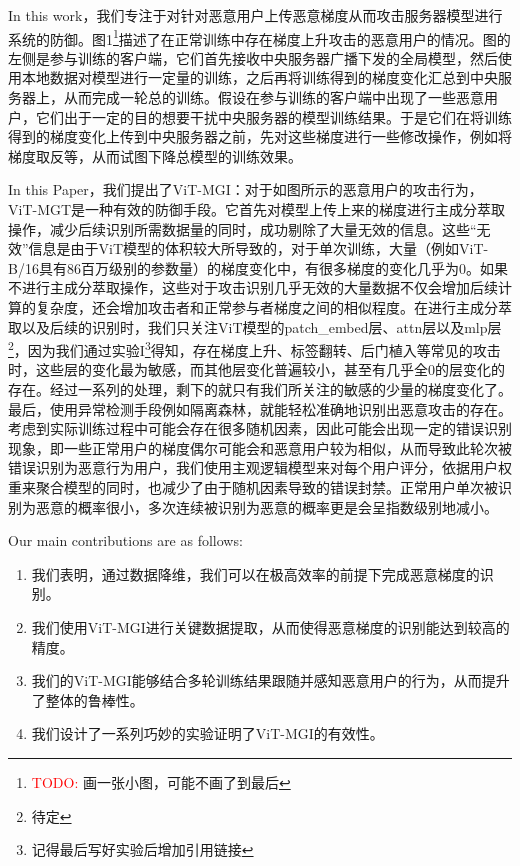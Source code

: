 \documentclass[conference]{IEEEtran}
\begin{document}
In this work，我们专注于对针对恶意用户上传恶意梯度从而攻击服务器模型进行系统的防御。图1\footnote{\textcolor{red}{TODO:} 画一张小图，可能不画了到最后}描述了在正常训练中存在梯度上升攻击的恶意用户的情况。图的左侧是参与训练的客户端，它们首先接收中央服务器广播下发的全局模型，然后使用本地数据对模型进行一定量的训练，之后再将训练得到的梯度变化汇总到中央服务器上，从而完成一轮总的训练。假设在参与训练的客户端中出现了一些恶意用户，它们出于一定的目的想要干扰中央服务器的模型训练结果。于是它们在将训练得到的梯度变化上传到中央服务器之前，先对这些梯度进行一些修改操作，例如将梯度取反等，从而试图下降总模型的训练效果。

In this Paper，我们提出了ViT-MGI：对于如图所示的恶意用户的攻击行为，ViT-MGT是一种有效的防御手段。它首先对模型上传上来的梯度进行主成分萃取操作，减少后续识别所需数据量的同时，成功剔除了大量无效的信息。这些“无效”信息是由于ViT模型的体积较大所导致的，对于单次训练，大量（例如ViT-B/16具有86百万级别的参数量）的梯度变化中，有很多梯度的变化几乎为0。如果不进行主成分萃取操作，这些对于攻击识别几乎无效的大量数据不仅会增加后续计算的复杂度，还会增加攻击者和正常参与者梯度之间的相似程度。在进行主成分萃取以及后续的识别时，我们只关注ViT模型的patch\_embed层、attn层以及mlp层\footnote{待定}，因为我们通过实验I\footnote{记得最后写好实验后增加引用链接}得知，存在梯度上升、标签翻转、后门植入等常见的攻击时，这些层的变化最为敏感，而其他层变化普遍较小，甚至有几乎全0的层变化的存在。经过一系列的处理，剩下的就只有我们所关注的敏感的少量的梯度变化了。最后，使用异常检测手段例如隔离森林，就能轻松准确地识别出恶意攻击的存在。考虑到实际训练过程中可能会存在很多随机因素，因此可能会出现一定的错误识别现象，即一些正常用户的梯度偶尔可能会和恶意用户较为相似，从而导致此轮次被错误识别为恶意行为用户，我们使用主观逻辑模型来对每个用户评分，依据用户权重来聚合模型的同时，也减少了由于随机因素导致的错误封禁。正常用户单次被识别为恶意的概率很小，多次连续被识别为恶意的概率更是会呈指数级别地减小。

Our main contributions are as follows:

\begin{enumerate}
    \item 我们表明，通过数据降维，我们可以在极高效率的前提下完成恶意梯度的识别。
    \item 我们使用ViT-MGI进行关键数据提取，从而使得恶意梯度的识别能达到较高的精度。
    \item 我们的ViT-MGI能够结合多轮训练结果跟随并感知恶意用户的行为，从而提升了整体的鲁棒性。
    \item 我们设计了一系列巧妙的实验证明了ViT-MGI的有效性。
\end{enumerate}
\end{document}
